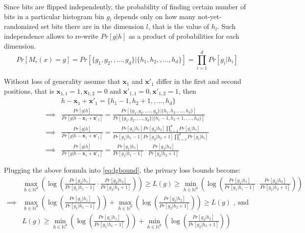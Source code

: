 \documentclass[11pt]{article}
\newcommand{\bbx}{\pmb{x}}
\newcommand{\N}{\mathbb{N}}
\begin{document}
Since bits are flipped independently, the probability of finding certain number of bits in a particular histogram bin $g_l$ depends only on how many not-yet-randomized set bits there are in the dimension $l$, that is the value of $h_l$.  Such independence allows to re-write $Pr [ g | h]$ as a product of probabilities for each dimension.
 \[
Pr [ M_r(x) = g ] = Pr [    \{ {g}_1, {g}_2, , \dots, {g}_d\} |  \{ {h}_1, {h}_2, , \dots, {h}_d\} ] = \prod_{i=1}^d Pr[ g_i | h_i] 
\]

Without loss of generality assume that $\bbx_1$ and $\bbx'_1$ differ in the first and second positions, that is $\bbx_{1,1} = 1, \bbx_{1,2} = 0$ and $\bbx'_{1,1} = 0, \bbx'_{1,2} = 1$, then
\begin{align*}
 & h  - \bbx_1 + \bbx'_1 = \{ {h}_1 - 1, {h}_2 + 1, , \dots, {h}_d\} \\
 \implies &  \frac{  Pr [ g | h ]   } {    Pr [ g | h  - \bbx_1 + \bbx'_1  ]  } = \frac{ Pr [    \{ {g}_1, {g}_2, , \dots, {g}_d\} |  \{ {h}_1, {h}_2, , \dots, {h}_d\} ] } { Pr [    \{ {g}_1, {g}_2, , \dots, {g}_d\} |  \{ {h}_1 - 1, {h}_2 + 1, , \dots, {h}_d\} ]  } \\
  \implies &  \frac{  Pr [ g | h ]   } {    Pr [ g | h  - \bbx_1 + \bbx'_1  ]  } = \frac{  Pr[ g_1 | h_1] Pr[ g_2 | h_2] \prod_{i=3}^d Pr[ g_i | h_i]  } {  Pr[ g_1 | h_1 - 1] Pr[ g_2 | h_2 + 1] \prod_{i=3}^d Pr[ g_i | h_i]  }  \\
   \implies &  \frac{  Pr [ g | h ]   } {    Pr [ g | h  - \bbx_1 + \bbx'_1  ]  } =   \frac{  Pr[ g_1 | h_1]  } {  Pr[ g_1 | h_1 - 1]  } \cdot \frac{  Pr[ g_2 | h_2]  } {  Pr[ g_2 | h_2 + 1]  } 
\end{align*}

Plugging the above formula into \eqref{eq:lgbound}, the privacy loss bounds become:
\begin{align*}
& \max_{h \in \N^d}  \left ( \log \left (   \frac{  Pr[ g_1 | h_1]  } {  Pr[ g_1 | h_1 - 1]  } \cdot \frac{  Pr[ g_2 | h_2]  } {  Pr[ g_2 | h_2 + 1]  }  \right ) \right ) \ge L(g) \ge  \min_{h \in \N^d}  \left ( \log \left (  \frac{  Pr[ g_1 | h_1]  } {  Pr[ g_1 | h_1 - 1]  } \cdot \frac{  Pr[ g_2 | h_2]  } {  Pr[ g_2 | h_2 + 1]  }   \right ) \right ) \\
\implies &  \max_{h \in \N^d}  \left ( \log \left (   \frac{  Pr[ g_1 | h_1]  } {  Pr[ g_1 | h_1 - 1]  } \right ) \right )  + \max_{h \in \N^d}  \left ( \log  \left (\frac{  Pr[ g_2 | h_2]  } {  Pr[ g_2 | h_2 + 1]  }  \right) \right) \ge L(g) \text{ , and } \\
&  L(g) \ge \min_{h \in \N^d}  \left ( \log \left (   \frac{  Pr[ g_1 | h_1]  } {  Pr[ g_1 | h_1 - 1]  } \right ) \right )  + \min_{h \in \N^d}  \left ( \log  \left (\frac{  Pr[ g_2 | h_2]  } {  Pr[ g_2 | h_2 + 1]  }  \right) \right)
\end{align*}
\end{document}
